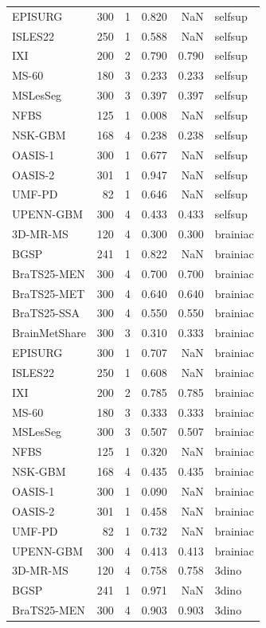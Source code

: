\begin{tabular}{lrrrrl}
EPISURG & 300 & 1 & 0.820 & NaN & selfsup \\
ISLES22 & 250 & 1 & 0.588 & NaN & selfsup \\
IXI & 200 & 2 & 0.790 & 0.790 & selfsup \\
MS-60 & 180 & 3 & 0.233 & 0.233 & selfsup \\
MSLesSeg & 300 & 3 & 0.397 & 0.397 & selfsup \\
NFBS & 125 & 1 & 0.008 & NaN & selfsup \\
NSK-GBM & 168 & 4 & 0.238 & 0.238 & selfsup \\
OASIS-1 & 300 & 1 & 0.677 & NaN & selfsup \\
OASIS-2 & 301 & 1 & 0.947 & NaN & selfsup \\
UMF-PD & 82 & 1 & 0.646 & NaN & selfsup \\
UPENN-GBM & 300 & 4 & 0.433 & 0.433 & selfsup \\
3D-MR-MS & 120 & 4 & 0.300 & 0.300 & brainiac \\
BGSP & 241 & 1 & 0.822 & NaN & brainiac \\
BraTS25-MEN & 300 & 4 & 0.700 & 0.700 & brainiac \\
BraTS25-MET & 300 & 4 & 0.640 & 0.640 & brainiac \\
BraTS25-SSA & 300 & 4 & 0.550 & 0.550 & brainiac \\
BrainMetShare & 300 & 3 & 0.310 & 0.333 & brainiac \\
EPISURG & 300 & 1 & 0.707 & NaN & brainiac \\
ISLES22 & 250 & 1 & 0.608 & NaN & brainiac \\
IXI & 200 & 2 & 0.785 & 0.785 & brainiac \\
MS-60 & 180 & 3 & 0.333 & 0.333 & brainiac \\
MSLesSeg & 300 & 3 & 0.507 & 0.507 & brainiac \\
NFBS & 125 & 1 & 0.320 & NaN & brainiac \\
NSK-GBM & 168 & 4 & 0.435 & 0.435 & brainiac \\
OASIS-1 & 300 & 1 & 0.090 & NaN & brainiac \\
OASIS-2 & 301 & 1 & 0.458 & NaN & brainiac \\
UMF-PD & 82 & 1 & 0.732 & NaN & brainiac \\
UPENN-GBM & 300 & 4 & 0.413 & 0.413 & brainiac \\
3D-MR-MS & 120 & 4 & 0.758 & 0.758 & 3dino \\
BGSP & 241 & 1 & 0.971 & NaN & 3dino \\
BraTS25-MEN & 300 & 4 & 0.903 & 0.903 & 3dino \\

\end{tabular}
